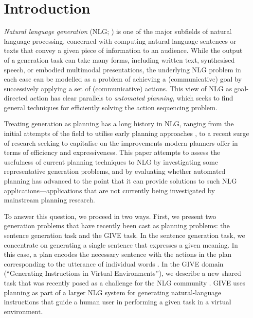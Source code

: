 \section{Introduction}
\label{sec:introduction}

\emph{Natural language generation} (NLG; \citealp{reiter00building})
is one of the major subfields of natural language processing,
concerned with computing natural language sentences or texts that
convey a given piece of information to an audience. While the output
of a generation task can take many forms, including written text,
synthesised speech, or embodied multimodal presentations, the
underlying NLG problem in each case can be modelled as a problem of
achieving a (communicative) goal by successively applying a set of
(communicative) actions. This view of NLG as goal-directed action has
clear parallels to \emph{automated planning}, which seeks to find
general techniques for efficiently solving the action sequencing
problem.

Treating generation as planning has a long history in NLG, ranging
from the initial attempts of the field to utilise early planning
approaches \citep{perrault80,appelt:planning,hovy88,young94dpocl}, to
a recent surge of research
\citep{Steedman-Petrick:07,KolSto07,brenner08:_contin_multiag_plann_approac_to_situat_dialog,benotti08b}
seeking to capitalise on the improvements modern planners offer in
terms of efficiency and expressiveness. This paper attempts to assess
the usefulness of current planning techniques to NLG by investigating
some representative generation problems, and by evaluating whether
automated planning has advanced to the point that it can provide
solutions to such NLG applications---applications that are not
currently being investigated by mainstream planning research.

To answer this question, we proceed in two ways. First, we present
two generation problems that have recently been cast as planning
problems: the sentence generation task and the GIVE task. In the
sentence generation task, we concentrate on generating a single
sentence that expresses a given meaning. In this case, a plan encodes
the necessary sentence with the actions in the plan corresponding to
the utterance of individual words \citep{KolSto07}. In the GIVE domain
(``Generating Instructions in Virtual Environments''), we describe a
new shared task that was recently posed as a challenge for the NLG
community \citep{ByrKolStrCasDalMooObe09}. GIVE uses planning as part
of a larger NLG system for generating natural-language instructions
that guide a human user in performing a given task in a virtual
environment.

